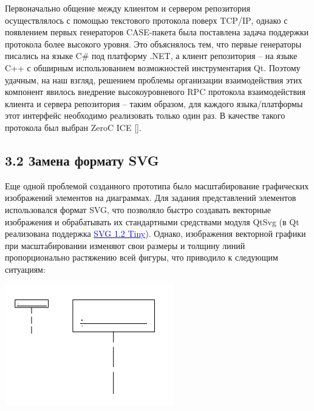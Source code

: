 \documentclass[a4paper]{article}
\newcommand\textstyleInternetlink[1]{\textcolor{blue}{#1}}
\begin{document}
{
Первоначально общение между клиентом и сервером репозитория
осуществлялось с помощью текстового протокола поверх
\foreignlanguage{english}{TCP}/\foreignlanguage{english}{IP}, однако с
появлением первых генераторов \foreignlanguage{english}{CASE}{}-пакета
была поставлена задача поддержки протокола более высокого уровня. Это
объяснялось тем, что первые генераторы писались на языке
\foreignlanguage{english}{C}\# под платформу
.\foreignlanguage{english}{NET}, а клиент репозитория – на языке
\foreignlanguage{english}{C}++ с обширным использованием возможностей
инструментария \foreignlanguage{english}{Qt}. Поэтому удачным, на наш
взгляд, решением проблемы организации взаимодействия этих компонент
явилось внедрение высокоуровневого \foreignlanguage{english}{RPC}
протокола взаимодействия клиента и сервера репозитория – таким образом,
для каждого языка/платформы этот интерфейс необходимо реализовать
только один раз. В качестве такого протокола был выбран
\foreignlanguage{english}{ZeroC} \foreignlanguage{english}{ICE}
\foreignlanguage{english}{[]}. }


\bigskip

\subsection[3.2 Замена формату SVG]{3.2 Замена формату
\foreignlanguage{english}{SVG}}
{
Еще одной проблемой созданного прототипа было масштабирование
графических изображений элементов на диаграммах. Для задания
представлений элементов использовался формат SVG, что позволяло быстро
создавать векторные изображения и обрабатывать их стандартными
средствами модуля QtSvg (в Qt реализована поддержка
\href{http://www.w3.org/TR/SVGMobile12/}{\textstyleInternetlink{SVG 1.2
Tiny}}). Однако, изображения векторной графики при масштабировании
изменяют свои размеры и толщину линий пропорционально растяжению всей
фигуры, что приводило к следующим ситуациям:}

{\centering 
\includegraphics[width=7.35cm,height=5.295cm]{draft04-img3.jpg} \par}
\end{document}
